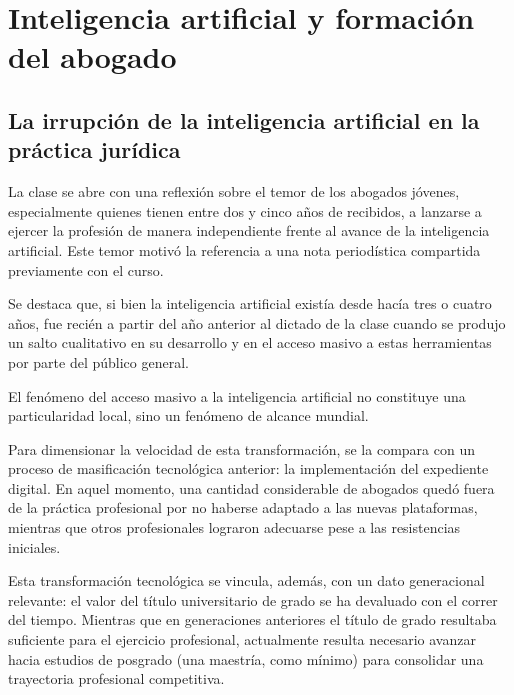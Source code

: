 \documentclass[12pt,oneside]{book}
\begin{document}
\chapter[IA y formación del abogado]{Inteligencia artificial y formación del abogado}

\section{La irrupción de la inteligencia artificial en la práctica jurídica}

La clase se abre con una reflexión sobre el temor de los abogados jóvenes, especialmente quienes tienen entre dos y cinco años de recibidos, a lanzarse a ejercer la profesión de manera independiente frente al avance de la inteligencia artificial. Este temor motivó la referencia a una nota periodística compartida previamente con el curso.

Se destaca que, si bien la inteligencia artificial existía desde hacía tres o cuatro años, fue recién a partir del año anterior al dictado de la clase cuando se produjo un salto cualitativo en su desarrollo y en el acceso masivo a estas herramientas por parte del público general.

\begin{important}
El fenómeno del acceso masivo a la inteligencia artificial no constituye una particularidad local, sino un fenómeno de alcance mundial.
\end{important}

Para dimensionar la velocidad de esta transformación, se la compara con un proceso de masificación tecnológica anterior: la implementación del expediente digital. En aquel momento, una cantidad considerable de abogados quedó fuera de la práctica profesional por no haberse adaptado a las nuevas plataformas, mientras que otros profesionales lograron adecuarse pese a las resistencias iniciales.

Esta transformación tecnológica se vincula, además, con un dato generacional relevante: el valor del título universitario de grado se ha devaluado con el correr del tiempo. Mientras que en generaciones anteriores el título de grado resultaba suficiente para el ejercicio profesional, actualmente resulta necesario avanzar hacia estudios de posgrado (una maestría, como mínimo) para consolidar una trayectoria profesional competitiva.
\end{document}

